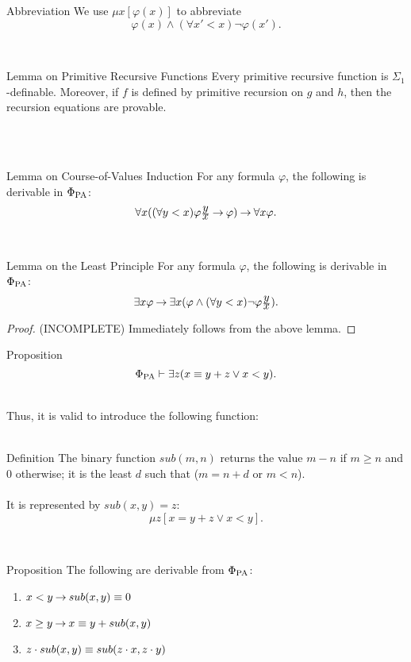 \noindent
\begin{definition}{Abbreviation}
We use $\mu x [\varphi(x)]$ to abbreviate
\[
\varphi(x) \land (\forall x' < x)\neg\varphi(x').
\]
\end{definition}\ \\
\begin{theorem}{Lemma on Primitive Recursive Functions}
Every primitive recursive function is $\Sigma_1$-definable. Moreover, if $f$ is defined by primitive recursion on $g$ and $h$, then the recursion equations are provable.
\end{theorem}\\
\ \\
\begin{theorem}{Lemma on Course-of-Values Induction}
For any formula $\varphi$, the following is derivable in $\Phi_{\mathrm{PA}}$:
\[
\forall x((\forall y < x)\varphi{\scriptstyle\frac{\displaystyle y}{\displaystyle x}} \mathbin{\rightarrow} \varphi) \mathbin{\rightarrow} \forall x \varphi.
\]
\end{theorem}\ \\
\begin{theorem}{Lemma on the Least Principle}
For any formula $\varphi$, the following is derivable in $\Phi_{\mathrm{PA}}$:
\[
\exists x \varphi \mathbin{\rightarrow} \exists x (\varphi \land (\forall y < x)\neg\varphi{\scriptstyle\frac{\displaystyle y}{\displaystyle x}}).
\]
\end{theorem}
\begin{proof}
(INCOMPLETE) Immediately follows from the above lemma.
\end{proof}
\begin{theorem}{Proposition}
\[
\Phi_{\mathrm{PA}} \vdash \exists z (x \equiv y + z \lor x < y).
\]
\end{theorem}\ \\
Thus, it is valid to introduce the following function:\\
\ \\
\begin{definition}{Definition}
The binary function $sub(m, n)$ returns the value $m - n$ if $m \geq n$ and $0$ otherwise; it is the least $d$ such that ($m = n + d$ or $m < n$).\\
\ \\
It is represented by $sub(x, y) \equal z$:
\[
\mu z [x \equal y + z \lor x < y].
\]
\end{definition}\ \\
\begin{theorem}{Proposition}
The following are derivable from $\Phi_{\mathrm{PA}}$:
\begin{enumerate}[\rm(a)]
%
\item $x < y \mathbin{\rightarrow} sub(x, y) \equiv 0$
%
\item $x \geq y \mathbin{\rightarrow} x \equiv y + sub(x, y)$
%
\item $z \cdot sub(x, y) \equiv sub(z \cdot x, z \cdot y)$
%
\end{enumerate}
\end{theorem}\ \\
